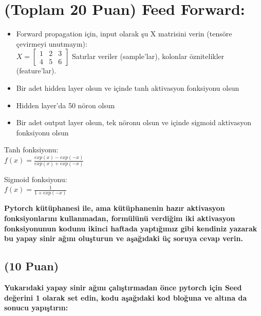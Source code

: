 \documentclass[11pt]{article}
\begin{document}
\section{(Toplam 20 Puan) Feed Forward:}
 
\begin{itemize}
    \item Forward propagation için, input olarak şu X matrisini verin (tensöre çevirmeyi unutmayın):\\
    $X = \begin{bmatrix}
        1 & 2 & 3\\
        4 & 5 & 6
        \end{bmatrix}$
    Satırlar veriler (sample'lar), kolonlar öznitelikler (feature'lar).
    \item Bir adet hidden layer olsun ve içinde tanh aktivasyon fonksiyonu olsun
    \item Hidden layer'da 50 nöron olsun
    \item Bir adet output layer olsun, tek nöronu olsun ve içinde sigmoid aktivasyon fonksiyonu olsun
\end{itemize}

Tanh fonksiyonu:\\
$f(x) = \frac{exp(x) - exp(-x)}{exp(x) + exp(-x)}$
\vspace{.2in}

Sigmoid fonksiyonu:\\
$f(x) = \frac{1}{1 + exp(-x)}$

\vspace{.2in}
 \textbf{Pytorch kütüphanesi ile, ama kütüphanenin hazır aktivasyon fonksiyonlarını kullanmadan, formülünü verdiğim iki aktivasyon fonksiyonunun kodunu ikinci haftada yaptığımız gibi kendiniz yazarak bu yapay sinir ağını oluşturun ve aşağıdaki üç soruya cevap verin.}
 
\subsection{(10 Puan)} \textbf{Yukarıdaki yapay sinir ağını çalıştırmadan önce pytorch için Seed değerini 1 olarak set edin, kodu aşağıdaki kod bloğuna ve altına da sonucu yapıştırın:}
\end{document}
